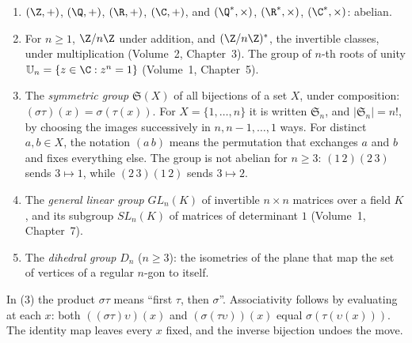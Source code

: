 \begin{example}\label{ex:examples}
\begin{enumerate}[label=(\arabic*)]
\item $(\Z,+)$, $(\Q,+)$, $(\R,+)$, $(\C,+)$, and $(\Q^*,\times)$, $(\R^*,\times)$, $(\C^*,\times)$: abelian.
\item For $n\ge1$, $\Z/n\Z$ under addition, and $(\Z/n\Z)^*$, the invertible classes, under multiplication (Volume~2, Chapter~3). The group of $n$-th roots of unity $\mathbb U_n=\{z\in\C:z^n=1\}$ (Volume~1, Chapter~5).
\item The \emph{symmetric group} $\mathfrak S(X)$ of all bijections of a set $X$, under composition: $(\sigma\tau)(x)=\sigma(\tau(x))$. For $X=\{1,\dots,n\}$ it is written $\mathfrak S_n$, and $|\mathfrak S_n|=n!$, by choosing the images successively in $n,n-1,\ldots,1$ ways. For distinct $a,b\in X$, the notation $(a\,b)$ means the permutation that exchanges $a$ and $b$ and fixes everything else. The group is not abelian for $n\ge3$: $(1\,2)(2\,3)$ sends $3\mapsto1$, while $(2\,3)(1\,2)$ sends $3\mapsto2$.
\item The \emph{general linear group} $GL_n(K)$ of invertible $n\times n$ matrices over a field $K$, and its subgroup $SL_n(K)$ of matrices of determinant $1$ (Volume~1, Chapter~7).
\item The \emph{dihedral group} $D_n$ ($n\ge3$): the isometries of the plane that map the set of vertices of a regular $n$-gon to itself.
\end{enumerate}
\end{example}

In (3) the product $\sigma\tau$ means ``first $\tau$, then $\sigma$''.
Associativity follows by evaluating at each $x$: both
$((\sigma\tau)\upsilon)(x)$ and $(\sigma(\tau\upsilon))(x)$ equal
$\sigma(\tau(\upsilon(x)))$. The identity map leaves every $x$ fixed,
and the inverse bijection undoes the move.

